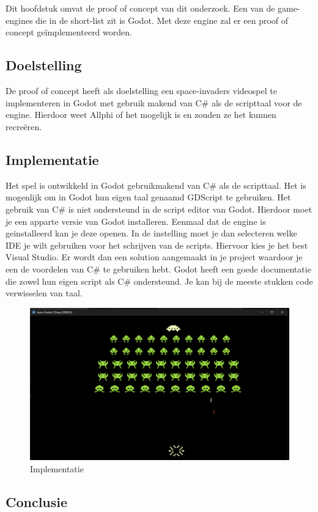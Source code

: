 
\chapter{}%
\label{ch:proof-of-concept}

Dit hoofdstuk omvat de proof of concept van dit onderzoek. Een van de game-engines die in de short-list zit is Godot. Met deze engine zal er een proof of concept geïmplementeerd worden.

\section{Doelstelling}
De proof of concept heeft als doelstelling een space-invaders videospel te implementeren in Godot met gebruik makend van C\# als de scripttaal voor de engine. Hierdoor weet Allphi of het mogelijk is en zouden ze het kunnen recreëren.

\section{Implementatie}
Het spel is ontwikkeld in Godot gebruikmakend van C\# als de scripttaal. Het is mogenlijk om in Godot hun eigen taal genaamd GDScript te gebruiken. Het gebruik van C\# is niet ondersteund in de script editor van Godot. Hierdoor moet je een apparte versie van Godot installeren. Eenmaal dat de engine is geinstalleerd kan je deze openen. In de instelling moet je dan selecteren welke IDE je wilt gebruiken voor het schrijven van de scripts. Hiervoor kies je het best Visual Studio. Er wordt dan een solution aangemaakt in je project waardoor je een de voordelen van C\# te gebruiken hebt. Godot heeft een goede documentatie die zowel hun eigen script als C\# ondersteund. Je kan bij de meeste stukken code verwisselen van taal.

\begin{figure}[h]
    \centering
    \includegraphics[width=1\textwidth]{ImplementatieSpel.png}
    \caption{Implementatie}
    \label{fig:POC}
\end{figure}

\section{Conclusie}
